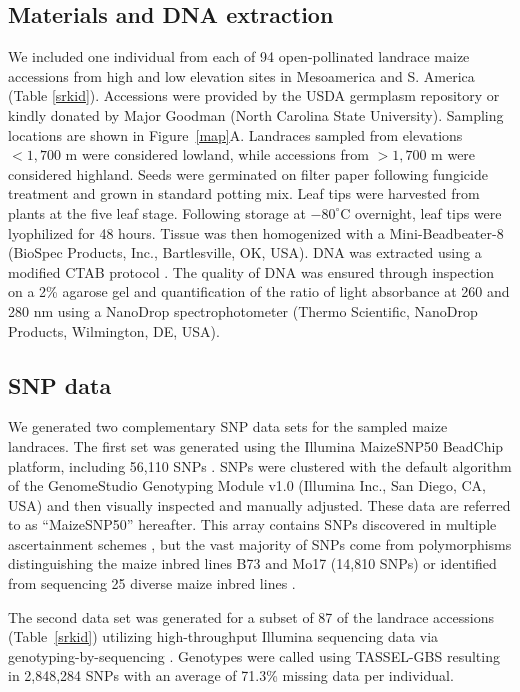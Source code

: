 \subsection*{Materials and DNA extraction}
We included one individual from each of 94 open-pollinated landrace maize accessions from high and low elevation sites in Mesoamerica and S. America (Table \ref{srkid}).   
Accessions were provided by the USDA germplasm repository or kindly donated by Major Goodman (North Carolina State University).  
Sampling locations are shown in Figure~\ref{map}A.  
Landraces sampled from elevations $<1,700$ m were considered lowland, while accessions from $>1,700$ m were considered highland.  
Seeds were germinated on filter paper following fungicide treatment and grown in standard potting mix.  
Leaf tips were harvested from plants at the five leaf stage.  
Following storage at $-80^{\circ}$C overnight, leaf tips were lyophilized for 48 hours.  
Tissue was then homogenized with a Mini-Beadbeater-8 (BioSpec Products, Inc., Bartlesville, OK, USA).  
DNA was extracted using a modified CTAB protocol \cite[]{CTAB}.  
The quality of DNA was ensured through inspection on a 2\% agarose gel and quantification of the ratio of light absorbance at 260 and 280 nm using a NanoDrop spectrophotometer (Thermo Scientific, NanoDrop Products, Wilmington, DE, USA).

\subsection*{SNP data}
We generated two complementary SNP data sets for the sampled maize landraces. 
The first set was generated using the Illumina MaizeSNP50 BeadChip platform, including 56,110 SNPs \cite[]{Ganal_2011_22174790}.  
SNPs were clustered with the default algorithm of the GenomeStudio Genotyping Module v1.0 (Illumina Inc., San Diego, CA, USA) and then visually inspected and manually adjusted.   
These data are referred to as ``MaizeSNP50'' hereafter.  
This array contains SNPs discovered in multiple ascertainment schemes \cite[]{Ganal_2011_22174790}, but the vast majority of SNPs come from polymorphisms distinguishing the maize inbred lines B73 and Mo17 (14,810 SNPs) or identified from sequencing 25 diverse maize inbred lines \cite[40,594 SNPs;][]{Gore_2009_19965431}.  

The second data set was generated for a subset of 87 of the landrace accessions (Table~\ref{srkid}) utilizing high-throughput Illumina sequencing data via genotyping-by-sequencing \cite[GBS;][]{Elshire2011}.
Genotypes were called using TASSEL-GBS \cite[]{Glaubitz_GBS} resulting in 2,848,284 SNPs with an average of 71.3\% missing data per individual.

